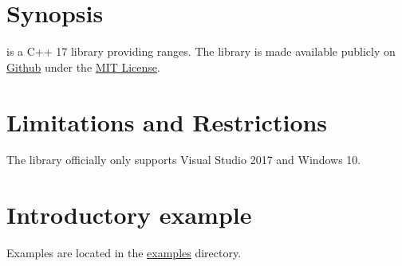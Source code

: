 \documentclass[oneside]{article}
\begin{document}
\maketitle
\tableofcontents
\section{Synopsis}
\textit{\GetOrganization{} \GetLibraryName} is a C++ 17 library providing ranges.
The library is made available publicly on
\href{\GetLibraryRepository}{Github}
under the
\href{\GetLibraryRepository/blob/master/LICENSE}{MIT License}.

\section{Limitations and Restrictions}
The library officially only supports Visual Studio 2017 and Windows 10.

\section{Introductory example}
Examples are located in the \href{\GetLibraryRepository/blob/master/examples}{examples} directory.
\end{document}
